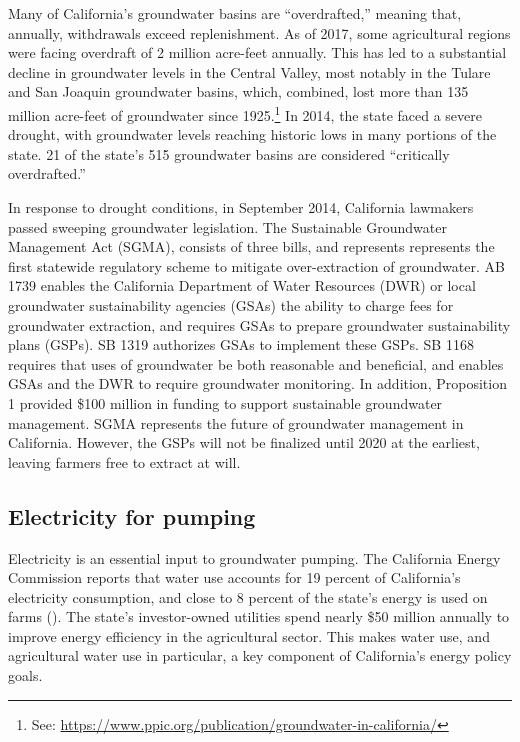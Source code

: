 Many of California's groundwater basins are ``overdrafted,'' meaning that, annually, withdrawals exceed replenishment. As of 2017, some agricultural regions were facing overdraft of 2 million acre-feet annually. This has led to a substantial decline in groundwater levels in the Central Valley, most notably in the Tulare and San Joaquin groundwater basins, which, combined, lost more than 135 million acre-feet of groundwater since 1925.\footnote{See: \url{https://www.ppic.org/publication/groundwater-in-california/}} In 2014, the state faced a severe drought, with groundwater levels reaching historic lows in many portions of the state. 21 of the state's 515 groundwater basins are considered ``critically overdrafted.''

In response to drought conditions, in September 2014, California lawmakers passed sweeping groundwater legislation. The Sustainable Groundwater Management Act (SGMA), consists of three bills, and represents  represents the first statewide regulatory scheme to mitigate over-extraction of groundwater. AB 1739 enables the California Department of Water Resources (DWR) or local groundwater sustainability agencies (GSAs) the ability to charge fees for groundwater extraction, and requires GSAs to prepare groundwater sustainability plans (GSPs). SB 1319 authorizes GSAs to implement these GSPs. SB 1168 requires that uses of groundwater be both reasonable and beneficial, and enables GSAs and the DWR to require groundwater monitoring. In addition, Proposition 1 provided \$100 million in funding to support sustainable groundwater management. SGMA represents the future of groundwater management in California. However, the GSPs will not be finalized until 2020 at the earliest, leaving farmers free to extract at will.

\subsection{Electricity for pumping}
Electricity is an essential input to groundwater pumping. The California Energy Commission reports that water use accounts for 19 percent of California's electricity consumption, and close to 8 percent of the state's energy is used on farms (\textcite{cec2005}). The state's investor-owned utilities spend nearly \$50 million annually to improve energy efficiency in the agricultural sector. This makes water use, and agricultural water use in particular, a key component of California's energy policy goals.

